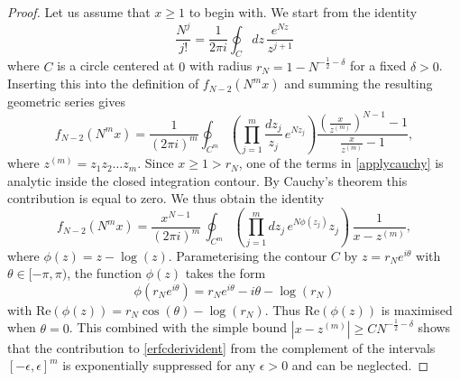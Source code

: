 \documentclass[11pt,reqno]{amsproc}
\numberwithin{equation}{section}
\numberwithin{theorem}{section}
\begin{document}
\begin{proof}
Let us assume that $x\geq 1$ to begin with. We start from the identity
\begin{equation}
\frac{N^{j}}{j!} = \frac{1}{2\pi i}\oint_{C}dz\,\frac{e^{Nz}}{z^{j+1}}
\end{equation}
where $C$ is a circle centered at $0$ with radius $r_{N} = 1-N^{-\frac{1}{2}-\delta}$ for a fixed $\delta>0$. Inserting this into the definition of $f_{N-2}(N^{m}x)$ and summing the resulting geometric series gives
\begin{equation}
f_{N-2}(N^{m}x) = \frac{1}{(2\pi i)^{m}}\oint_{C^{m}}\left(\prod_{j=1}^{m}\frac{dz_{j}}{z_{j}}\,e^{Nz_{j}}\right)\frac{\left(\frac{x}{z^{(m)}}\right)^{N-1}-1}{\frac{x}{z^{(m)}}-1}, \label{applycauchy}
\end{equation}
where $z^{(m)} = z_{1}z_{2}\ldots z_{m}$. Since $x \geq 1 > r_{N}$, one of the terms in \eqref{applycauchy} is analytic inside the closed integration contour. By Cauchy's theorem this contribution is equal to zero. We thus obtain the identity
\begin{equation}
f_{N-2}(N^{m}x) = \frac{x^{N-1}}{(2\pi i)^{m}}\,\oint_{C^{m}}\left(\prod_{j=1}^{m}dz_{j}\,e^{N\phi(z_j)}z_{j}\right)\,\frac{1}{x-z^{(m)}}, \label{erfcderivident}
\end{equation}
where $\phi(z) = z-\log(z)$. Parameterising the contour $C$ by $z = r_{N}e^{i\theta}$ with $\theta \in [-\pi,\pi)$, the function $\phi(z)$ takes the form
\begin{equation}
\phi(r_{N}e^{i\theta}) = r_{N}e^{i\theta}-i\theta-\log(r_{N}) \label{actionfnedge}
\end{equation}
with $\mathrm{Re}(\phi(z)) = r_{N}\cos(\theta)-\log(r_{N})$. Thus $\mathrm{Re}(\phi(z))$ is maximised when $\theta=0$. This combined with the simple bound $|x-z^{(m)}| \geq CN^{-\frac{1}{2}-\delta}$ shows that the contribution to \eqref{erfcderivident} from the complement of the intervals $[-\epsilon,\epsilon]^{m}$ is exponentially suppressed for any $\epsilon>0$ and can be neglected.


\end{proof}
\end{document}
